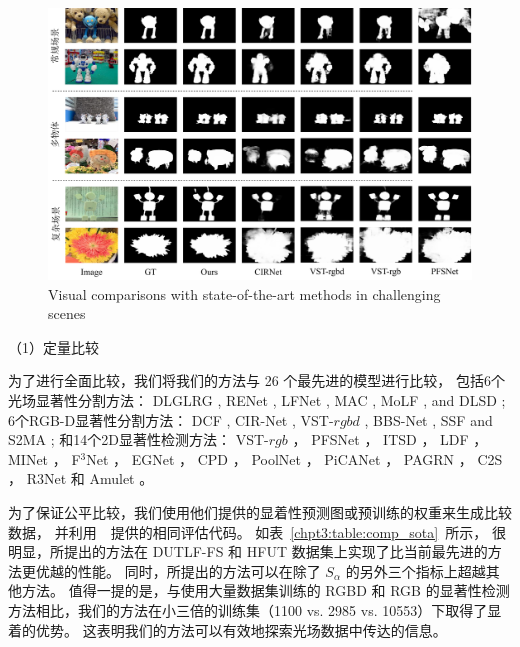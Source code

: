 \begin{figure}[!ht]
	\centering
	\includegraphics[width=\linewidth]{figures/chapter3/compare_2}
	{Visual comparisons with state-of-the-art methods in challenging scenes}
	\label{figure:figure_comparison_2}
\end{figure}


（1）定量比较

为了进行全面比较，我们将我们的方法与 26 个最先进的模型进行比较，
包括6个光场显著性分割方法：
DLGLRG \cite{liu2021light}, RENet \cite{piao2020exploit}, LFNet \cite{zhang2020lfnet},
MAC \cite{zhang2020light}, MoLF \cite{zhang2019memory}, and DLSD \cite{piao2019deep};
%
%
%
%
6个RGB-D显著性分割方法：
DCF \cite{ji2021calibrated}, CIR-Net \cite{cong2022cir}, VST-$rgbd$  \cite{liu2021visual},
BBS-Net     \cite{fan2020bbs}, SSF     \cite{zhang2020select} and S2MA    \cite{liu2020learning};
%
%
%
%
%
和14个2D显著性检测方法：
VST-$rgb$ \cite{liu2021visual}，
PFSNet \cite{ma2021pyramidal}，
ITSD \cite{zhou2020interactive}，
LDF \cite{wei2020label}，
MINet \cite{pang2020multi}，
F$^{3}$Net  \cite{wei2020f3net}， 
EGNet   \cite{zhao2019egnet}，
CPD  \cite{wu2019cascaded}，
PoolNet \cite{liu2019simple}，
PiCANet \cite{liu2018picanet}，
PAGRN \cite{wang2018detect}，
C2S   \cite{li2018contour}，
R3Net  \cite{deng2018r3net}
和
Amulet \cite{zhang2017amulet}。






为了保证公平比较，我们使用他们提供的显着性预测图或预训练的权重来生成比较数据，
并利用~\cite{liu2021visual}~提供的相同评估代码。
如表~\ref{chpt3:table:comp_sota}~所示，
很明显，所提出的方法在 DUTLF-FS 和 HFUT 数据集上实现了比当前最先进的方法更优越的性能。 同时，所提出的方法可以在除了 $ S_{\alpha} $ 的另外三个指标上超越其他方法。 值得一提的是，与使用大量数据集训练的 RGBD 和 RGB 的显著性检测方法相比，我们的方法在小三倍的训练集（1100 vs. 2985 vs. 10553）下取得了显着的优势。 这表明我们的方法可以有效地探索光场数据中传达的信息。 


